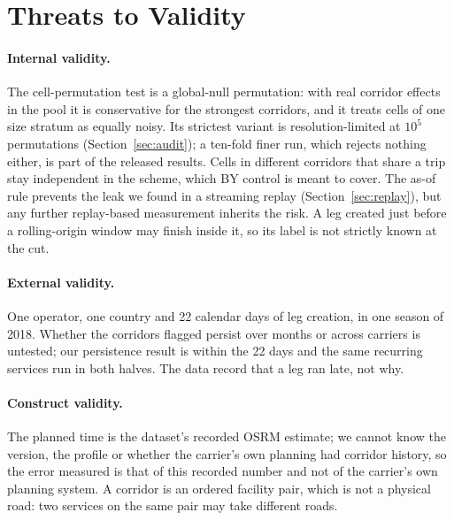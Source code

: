 \section{Threats to Validity}\label{sec:threats}

\paragraph{Internal validity.} The cell-permutation test is a global-null permutation: with real corridor effects in the pool it is conservative for the strongest corridors, and it treats cells of one size stratum as equally noisy. Its strictest variant is resolution-limited at $10^{5}$ permutations (Section~\ref{sec:audit}); a ten-fold finer run, which rejects nothing either, is part of the released results. Cells in different corridors that share a trip stay independent in the scheme, which BY control is meant to cover. The as-of rule prevents the leak we found in a streaming replay (Section~\ref{sec:replay}), but any further replay-based measurement inherits the risk. A leg created just before a rolling-origin window may finish inside it, so its label is not strictly known at the cut.

\paragraph{External validity.} One operator, one country and 22 calendar days of leg creation, in one season of 2018. Whether the corridors flagged persist over months or across carriers is untested; our persistence result is within the 22 days and the same recurring services run in both halves. The data record that a leg ran late, not why.

\paragraph{Construct validity.} The planned time is the dataset's recorded OSRM estimate; we cannot know the version, the profile or whether the carrier's own planning had corridor history, so the error measured is that of this recorded number and not of the carrier's own planning system. A corridor is an ordered facility pair, which is not a physical road: two services on the same pair may take different roads.

